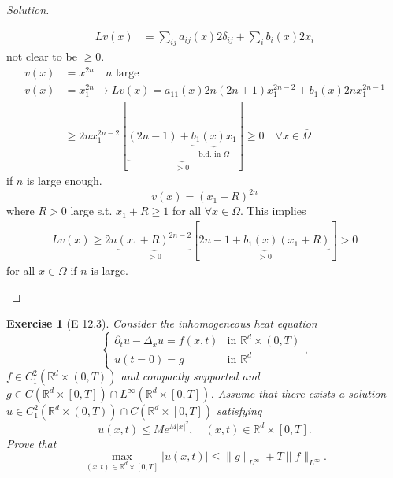\documentclass{report}
\theoremstyle{tommy}
\newtheorem{ex}[defn]{Exercise}
\begin{document}
\begin{proof}[Solution]
\begin{itemize}
\begin{align*}
      Lv(x) &= \sum_{ij} a_{ij}(x) 2 \delta_{ij} + \sum_i b_i(x) 2x_i
    \end{align*}
    not clear to be \(\ge 0\).
    \begin{align*}
      v(x) &= x^{2n} \quad \text{\(n\) large} \\
      v(x) &= x_1^{2n} \longrightarrow Lv(x) = a_{11}(x) 2n(2n+1)x_1^{2n-2} + b_1(x) 2n x_1^{2n-1} \\
      &\ge 2n x_1^{2n-2}[\underbrace{(2n-1) + \underbrace{b_1(x)x_1}_{\text{b.d. in \(\bar \Omega\)}}}_{> 0}] \ge 0 \quad \forall x \in \bar \Omega
    \end{align*}
    if \(n\) is large enough.
    \[v(x) = (x_1 + R)^{2n}\]
    where \(R > 0\) large s.t. \(x_1 + R \ge 1\) for all \(\forall x \in \bar \Omega\). This implies
    \begin{align*}
      Lv(x) \ge 2n \underbrace{(x_1 + R)^{2n-2}}_{> 0}[\underbrace{2n-1 + b_1(x) (x_1 + R)}_{> 0}] > 0
    \end{align*}
    for all \(x \in \bar \Omega\) if \(n\) is large.
    \end{itemize}
  \end{proof}

  \begin{ex}[E 12.3]
    Consider the inhomogeneous heat equation
    \[\begin{cases}
      \partial_tu-\Delta_x u = f(x,t) &\text{in } \mathbb{R}^d \times (0,T)\\ u(t=0) = g &\text{in } \mathbb{R}^d
    \end{cases},\]
    \(f \in C_1^2(\mathbb{R}^d \times (0,T))\) and compactly supported and \(g \in C(\mathbb{R}^d \times [0,T]) \cap L^\infty(\mathbb{R}^d \times [0,T])\). Assume that there exists a solution \(u \in C_1^2(\mathbb{R}^d \times (0,T)) \cap C(\mathbb{R}^d \times [0,T])\) satisfying \[u(x,t) \le Me^{M|x|^2}, \quad (x,t) \in \mathbb{R}^d \times [0,T].\]
    Prove that 
    \[\max_{(x,t) \in \mathbb{R}^d \times [0,T]} |u(x,t)| \le \|g\|_{L^\infty} + T\|f\|_{L^\infty}.\]
  \end{ex}
\end{document}
